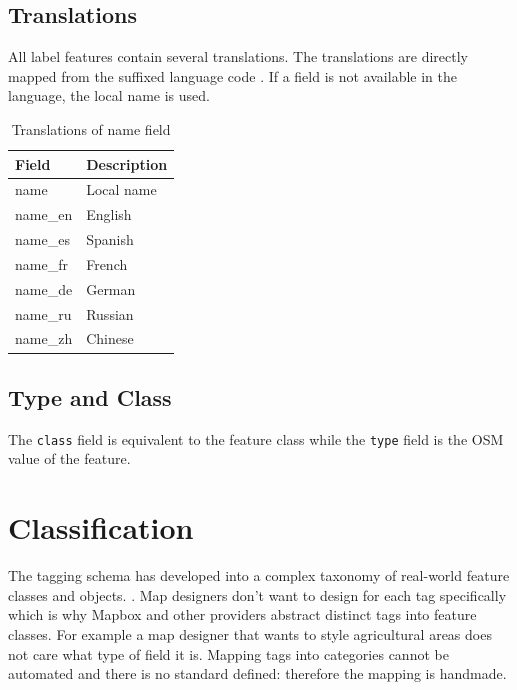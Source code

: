 \subsection{Translations}
All label features contain several translations.
The translations are directly mapped from the suffixed language code \cite{83_wiki.openstreetmap.org_2015}. If a field is not available in the language, the local name is used.

\begin{table}[H]
\centering
    \begin{tabular}{ll}
    \hline
     Field    & 	Description                                    \\
    \hline
    name      & Local name  \\
    name\_en	 & English                          \\
    name\_es	 & Spanish                          \\
    name\_fr	 & French                           \\
    name\_de	 & German                           \\
    name\_ru	 & Russian                          \\
    name\_zh	 & Chinese                          \\
    \end{tabular}
    \caption{Translations of name field}
\end{table}

\subsection{Type and Class}
The \texttt{class} field is equivalent to the feature class while the \texttt{type} field is the OSM value of the feature.
\newpage

\section{Classification}
\label{classification}

The \osm{} tagging schema has developed into a complex taxonomy of real-world feature classes and objects. \cite[p. 15]{haklay2008openstreetmap}.
Map designers don't want to design
for each tag specifically which is why Mapbox and other providers abstract distinct tags into feature classes. 
For example a map designer that wants to style agricultural areas does not care what type of field it is.
Mapping tags into categories cannot be automated and there is no standard defined: therefore the mapping is handmade.


